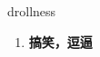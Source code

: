 
\begin{frame}
{\huge drollness}
\begin{center}
\begin{enumerate}\Large
  \item \textbf{搞笑，逗逼}
\end{enumerate}
\end{center}
\end{frame}
